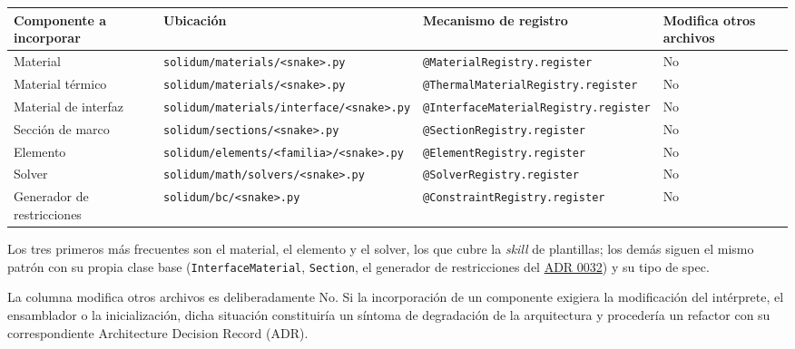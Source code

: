 \documentclass[11pt,oneside]{report}
\begin{document}
\begin{center}
\begin{tabularx}{\textwidth}{YYYY}
\hline
\textbf{Componente a incorporar} & \textbf{Ubicación} & \textbf{Mecanismo de registro} & \textbf{Modifica otros archivos} \\
\hline
Material & \texttt{solidum/\allowbreak{}materials/\allowbreak{}\textless{}snake\textgreater{}.\allowbreak{}py} & \texttt{@MaterialRegistry.\allowbreak{}register} & No \\
Material térmico & \texttt{solidum/\allowbreak{}materials/\allowbreak{}\textless{}snake\textgreater{}.\allowbreak{}py} & \texttt{@ThermalMaterialRegistry.\allowbreak{}register} & No \\
Material de interfaz & \texttt{solidum/\allowbreak{}materials/\allowbreak{}interface/\allowbreak{}\textless{}snake\textgreater{}.\allowbreak{}py} & \texttt{@InterfaceMaterialRegistry.\allowbreak{}register} & No \\
Sección de marco & \texttt{solidum/\allowbreak{}sections/\allowbreak{}\textless{}snake\textgreater{}.\allowbreak{}py} & \texttt{@SectionRegistry.\allowbreak{}register} & No \\
Elemento & \texttt{solidum/\allowbreak{}elements/\allowbreak{}\textless{}familia\textgreater{}/\allowbreak{}\textless{}snake\textgreater{}.\allowbreak{}py} & \texttt{@ElementRegistry.\allowbreak{}register} & No \\
Solver & \texttt{solidum/\allowbreak{}math/\allowbreak{}solvers/\allowbreak{}\textless{}snake\textgreater{}.\allowbreak{}py} & \texttt{@SolverRegistry.\allowbreak{}register} & No \\
Generador de restricciones & \texttt{solidum/\allowbreak{}bc/\allowbreak{}\textless{}snake\textgreater{}.\allowbreak{}py} & \texttt{@ConstraintRegistry.\allowbreak{}register} & No \\
\hline
\end{tabularx}
\end{center}
Los tres primeros más frecuentes son el material, el elemento y el solver, los que cubre la \textit{skill} de plantillas; los demás siguen el mismo patrón con su propia clase base (\texttt{InterfaceMaterial}, \texttt{Section}, el generador de restricciones del \hyperref[adr:0032]{ADR 0032}) y su tipo de spec.

La columna \textquotedbl{}modifica otros archivos\textquotedbl{} es deliberadamente \textquotedbl{}No\textquotedbl{}. Si la incorporación de un componente exigiera la modificación del intérprete, el ensamblador o la inicialización, dicha situación constituiría un síntoma de degradación de la arquitectura y procedería un refactor con su correspondiente Architecture Decision Record (ADR).
\end{document}
